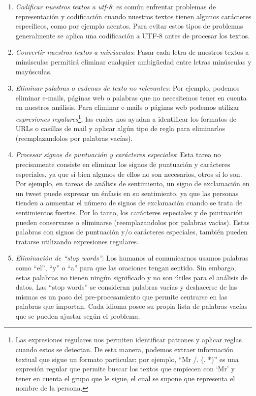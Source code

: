 \documentclass[12pt,a4paper]{article}
\begin{document}
\begin{sloppypar}
\begin{enumerate}
\item \textit{Codificar nuestros textos a utf-8}: es común enfrentar problemas de representación y codificación cuando nuestros textos tienen algunos carácteres específicos, como por ejemplo acentos. Para evitar estos tipos de problemas generalmente se aplica una codificación a UTF-8 antes de procesar los textos.
\item \textit{Convertir nuestros textos a minúsculas}: Pasar cada letra de nuestros textos a minúsculas permitirá eliminar cualquier ambigüedad entre letras minúsculas y mayúsculas. 
\item \textit{Eliminar palabras o cadenas de texto no relevantes}: Por ejemplo, podemos eliminar e-mails, páginas web o palabras que no necesitemos tener en cuenta en nuestros análisis. Para eliminar e-mails o páginas web podemos utilizar \textit{expresiones regulares}\footnote{Las expresiones regulares nos permiten identificar patrones y aplicar reglas cuando estos se detectan. De esta manera, podemos extraer información textual que sigue un formato particular: por ejemplo, “Mr /. (. *)” es una expresión regular que permite buscar los textos que empiecen con ‘Mr’ y tener en cuenta el grupo que le sigue, el cual se supone que representa el nombre de la persona\cite{NLP_2}.}, las cuales nos ayudan a identificar los formatos de URLs o casillas de mail y aplicar algún tipo de regla para eliminarlos (reemplazandolos por palabras vacías). 
\item \textit{Procesar signos de puntuación y carácteres especiales}: Esta tarea no precisamente consiste en eliminar los signos de puntuación y carácteres especiales, ya que si bien algunos de ellos no son necesarios, otros sí lo son. Por ejemplo, en tareas de análisis de sentimiento, un signo de exclamación en un tweet puede expresar un énfasis en su sentimiento, ya que las personas tienden a aumentar el número de signos de exclamación cuando se trata de sentimientos fuertes. Por lo tanto, los carácteres especiales y de puntuación pueden conservarse o eliminarse (reemplazandolos por palabras vacías). Estas palabras con signos de puntuación y/o carácteres especiales, también pueden tratarse utilizando expresiones regulares.
\item \textit{Eliminación de “stop words”}:  Los humanos al comunicarnos usamos palabras como “el”, “y” o “a” para que las oraciones tengan sentido. Sin embargo, estas palabras no tienen ningún significado y no son útiles para el análisis de datos. Las “stop words” se consideran palabras vacías y deshacerse de las mismas es un paso del pre-procesamiento que permite centrarse en las palabras que importan. Cada idioma posee su propia lista de palabras vacías que se pueden ajustar según el problema. 


\end{enumerate}
\end{sloppypar}
\end{document}
